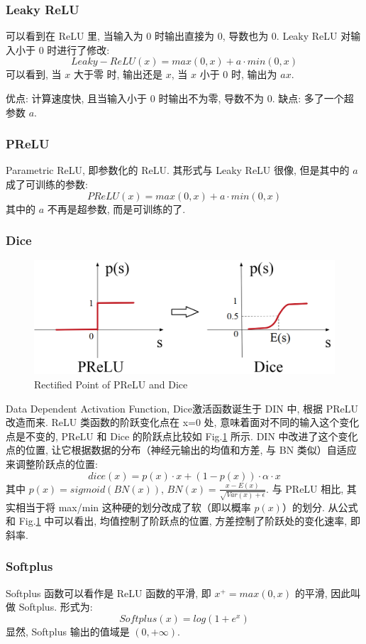 \subsubsection{Leaky ReLU}
可以看到在 ReLU 里, 当输入为 0 时输出直接为 0, 导数也为 0. Leaky ReLU 对输入小于 0 时进行了修改: 
$$
Leaky-ReLU(x) = max(0, x) + a \cdot min(0, x)
$$
可以看到, 当 $x$ 大于零 时, 输出还是 $x$, 当 $x$ 小于 0 时, 输出为 $a x$. 

优点: 计算速度快, 且当输入小于 0 时输出不为零, 导数不为 0. 缺点: 多了一个超参数 $a$. 

\subsubsection{PReLU}
Parametric ReLU, 即参数化的 ReLU. 其形式与 Leaky ReLU 很像, 但是其中的 $a$ 成了可训练的参数: 
$$
PReLU(x) = max(0, x) + a \cdot min(0, x)
$$
其中的 $a$ 不再是超参数, 而是可训练的了. 

\subsubsection{Dice}
\begin{figure}[h]
	\centering
	\includegraphics[width=.6\textwidth]{pics/prelu-dice.png}
	\caption{Rectified Point of PReLU and Dice}
	\label{fig:prelu_dice}
\end{figure}
Data Dependent Activation Function, Dice激活函数诞生于 DIN 中, 根据 PReLU 改造而来. ReLU 类函数的阶跃变化点在 x=0 处, 意味着面对不同的输入这个变化点是不变的, PReLU 和 Dice 的阶跃点比较如 Fig.\ref{fig:prelu_dice} 所示. DIN 中改进了这个变化点的位置, 让它根据数据的分布（神经元输出的均值和方差, 与 BN 类似）自适应来调整阶跃点的位置: 
$$
dice(x) = p(x) \cdot x + (1 - p(x)) \cdot \alpha \cdot x
$$
其中 $p(x) = sigmoid( BN(x))$, $BN(x) = \frac{x - E(x)}{\sqrt{Var(x) + \epsilon}}$. 与 PReLU 相比, 其实相当于将 max/min 这种硬的划分改成了软（即以概率 $p(x)$）的划分. 从公式和 Fig.\ref{fig:prelu_dice} 中可以看出, 均值控制了阶跃点的位置, 方差控制了阶跃处的变化速率, 即斜率. 

\subsubsection{Softplus}
Softplus 函数可以看作是 ReLU 函数的平滑, 即 $x^+ = max(0, x)$ 的平滑, 因此叫做 Softplus. 形式为: 
$$
Softplus(x) = log(1+e^x)
$$
显然, Softplus 输出的值域是 $(0, +\infty)$. 

